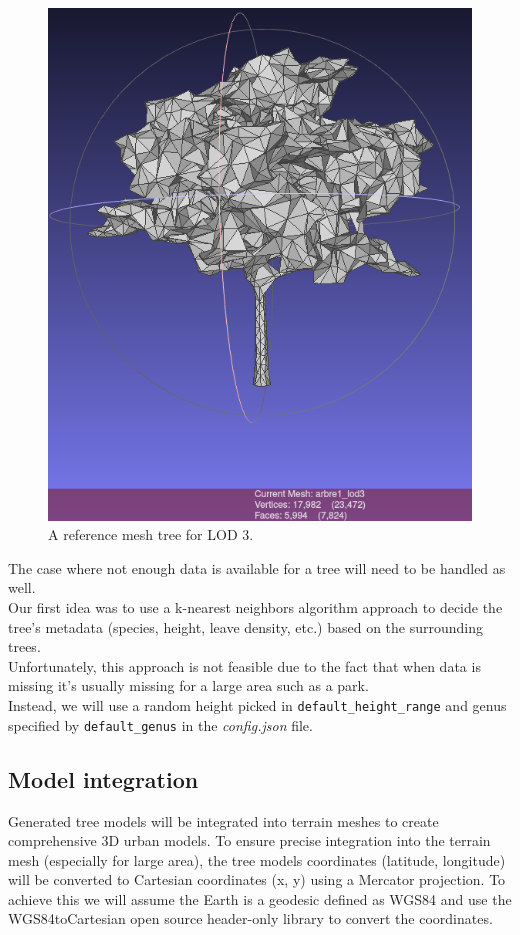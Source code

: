 \documentclass[12pt]{article}
\begin{document}
\begin{figure}[H]
\begin{minipage}{0.45\textwidth}
        \includegraphics[width=\textwidth]{images/lod3.png}
        \caption{A reference mesh tree for LOD 3.}
    \end{minipage}
\end{figure}

The case where not enough data is available for a tree will need to be handled
as well. \\
Our first idea was to use a k-nearest neighbors algorithm \cite{k-NN} approach to
decide the tree's metadata (species, height, leave density, etc.) based on the
surrounding trees. \\
Unfortunately, this approach is not feasible due to the fact that
when data is missing it's usually missing for a large area such as a park. \\
Instead, we will use a random height picked in \texttt{default\_height\_range}
and genus specified by \texttt{default\_genus} in the \textit{config.json} file.

\subsection{Model integration}
Generated tree models will be integrated into terrain meshes to create comprehensive
3D urban models. To ensure precise integration into the terrain mesh (especially for large area), the tree models coordinates
(latitude, longitude) will be converted to Cartesian coordinates (x, y) using
a Mercator projection\cite{mercator-proj}. To achieve this we will assume the Earth is a geodesic
defined as WGS84 \cite{wgs84} and use the WGS84toCartesian\cite{wgs84_to_cartesian} open source header-only
  library to convert the coordinates.
\end{document}
